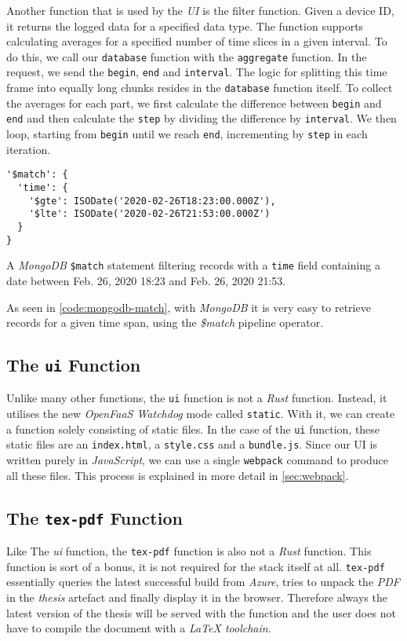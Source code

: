 Another function that is used by the \textit{UI} is the filter function. Given a device ID, it
returns the logged data for a specified data type. The function supports calculating averages for a
specified number of time slices in a given interval. To do this, we call our \texttt{database}
function with the \texttt{aggregate} function. In the request, we send the \texttt{begin},
\texttt{end} and \texttt{interval}. The logic for splitting this time frame into equally long chunks
resides in the \texttt{database} function itself. To collect the averages for each part, we first
calculate the difference between \texttt{begin} and \texttt{end} and then calculate the
\texttt{step} by dividing the difference by \texttt{interval}. We then loop, starting from
\texttt{begin} until we reach \texttt{end}, incrementing by \texttt{step} in each iteration.

\begin{code}[H]
  \begin{lstlisting}[language=mongo]
'$match': {
  'time': {
    '$gte': ISODate('2020-02-26T18:23:00.000Z'),
    '$lte': ISODate('2020-02-26T21:53:00.000Z')
  }
}
  \end{lstlisting}
  \caption{A \textit{MongoDB} \texttt{\$match} statement filtering records with a \texttt{time}
  field containing a date between Feb. 26, 2020 18:23 and Feb. 26, 2020 21:53.}
  \label{code:mongodb-match}
\end{code}

As seen in \autoref{code:mongodb-match}, with \textit{MongoDB} it is very easy to retrieve records for a
given time span, using the \textit{\$match} pipeline operator.

\subsection{The \texttt{ui} Function}

Unlike many other functions, the \texttt{ui} function is not a \textit{Rust} function. Instead, it
utilises the new \textit{OpenFaaS Watchdog} mode called \texttt{static}. With it, we can create a
function solely consisting of static files. In the case of the \texttt{ui} function, these static
files are an \texttt{index.html}, a \texttt{style.css} and a \texttt{bundle.js}. Since our UI is
written purely in \textit{JavaScript}, we can use a single \texttt{webpack} command to produce all
these files. This process is explained in more detail in \autoref{sec:webpack}.

\subsection{The \texttt{tex-pdf} Function}

Like The \textit{ui} function, the \texttt{tex-pdf} function is also not a \textit{Rust} function.
This function is sort of a bonus, it is not required for the stack itself at all. \texttt{tex-pdf}
essentially queries the latest successful build from \textit{Azure}, tries to unpack the
\textit{PDF} in the \textit{thesis} artefact and finally display it in the browser. Therefore always
the latest version of the thesis will be served with the function and the user does not have to
compile the document with a \textit{LaTeX toolchain}.
